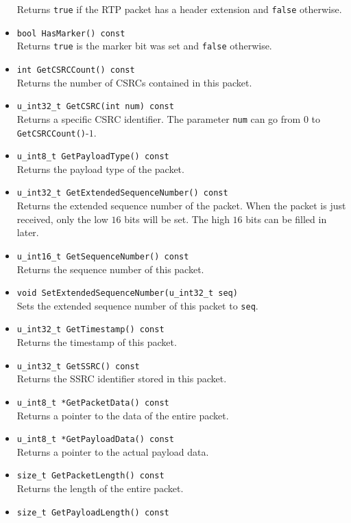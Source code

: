 \documentclass[12pt,a4paper]{article}
\begin{document}
\begin{itemize}
						Returns {\tt true} if the RTP packet has a header extension and
						{\tt false} otherwise.
					\item {\tt bool HasMarker() const}\\
						Returns {\tt true} is the marker bit was set and {\tt false}
						otherwise.
					\item {\tt int GetCSRCCount() const}\\
						Returns the number of CSRCs contained in this packet.
					\item {\tt u\_int32\_t GetCSRC(int num) const}\\
						Returns a specific CSRC identifier. The parameter {\tt num} 
						can go from $0$ to {\tt GetCSRCCount()}-$1$.
					\item {\tt u\_int8\_t GetPayloadType() const}\\
						Returns the payload type of the packet.
					\item {\tt u\_int32\_t GetExtendedSequenceNumber() const}\\
						Returns the extended sequence number of the packet. When
						the packet is just received, only the low $16$ bits will
						be set. The high $16$ bits can be filled in later.
					\item {\tt u\_int16\_t GetSequenceNumber() const}\\
						Returns the sequence number of this packet.
					\item {\tt void SetExtendedSequenceNumber(u\_int32\_t seq)}\\
						Sets the extended sequence number of this packet to {\tt seq}.
					\item {\tt u\_int32\_t GetTimestamp() const}\\
						Returns the timestamp of this packet.
					\item {\tt u\_int32\_t GetSSRC() const}\\
						Returns the SSRC identifier stored in this packet.
					\item {\tt u\_int8\_t *GetPacketData() const}\\
						Returns a pointer to the data of the entire packet.
					\item {\tt u\_int8\_t *GetPayloadData() const}\\
						Returns a pointer to the actual payload data.
					\item {\tt size\_t GetPacketLength() const}\\
						Returns the length of the entire packet.
					\item {\tt size\_t GetPayloadLength() const}\\

\end{itemize}
\end{document}
